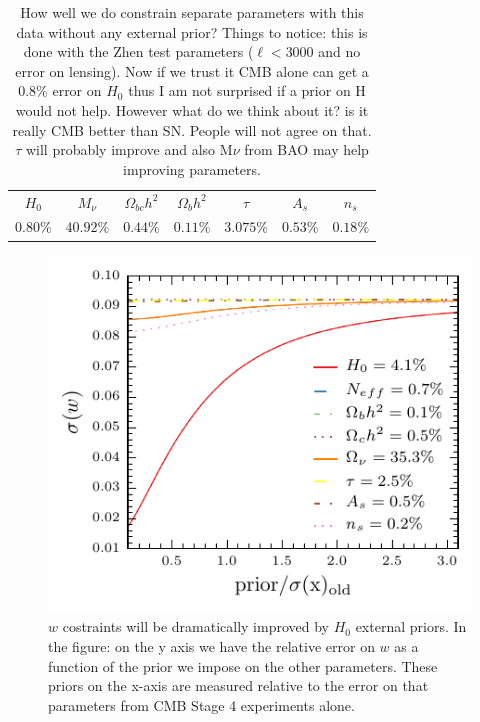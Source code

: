 \documentclass[aps,prd,reprint,superscriptaddress]{revtex4-1}
\begin{document}
\begin{table}[htdp]

\begin{center}
\begin{tabular}{|c|c|c|c|c|c|c|}
\hline
$H_{0}$ &$ M_{\nu}$ &$\Omega_{bc}h^{2}$&$\Omega_{b}h^{2}$&$\tau$&$A_{s}$&$n_{s}$ \\
$0.80 \%$&$40.92\%$&$0.44\%$&$0.11\%$&$3.075\%$&$0.53\%$&$0.18\%$\\

\hline
\end{tabular}
\caption{How well we do constrain separate parameters with this data without any external prior? Things to notice: this is done with the Zhen test parameters ($\ell<3000$ and no error on lensing). Now if we trust it CMB alone can get a $0.8\%$ error on $H_{0}$ thus I am not surprised if a prior on H would not help. However what do we think about it? is it really CMB better than SN. People will not agree on that. $\tau$ will probably improve and also M$\nu$ from BAO may help improving parameters.}
\end{center}
\label{default}
\end{table}%


\begin{figure}[htbp]
\begin{center}
\includegraphics{prior_w_snow_mass.pdf}
\caption{$w$ costraints will be dramatically improved by $H_{0}$ external priors. 
\footnotesize In the figure: on the y axis we have the relative error on $w$ as a function of the prior we impose on the other parameters. These priors on the x-axis are measured relative to the error on that parameters from CMB Stage 4 experiments alone.}
\label{fig:prior_w}
\end{center}
\end{figure}
\end{document}
